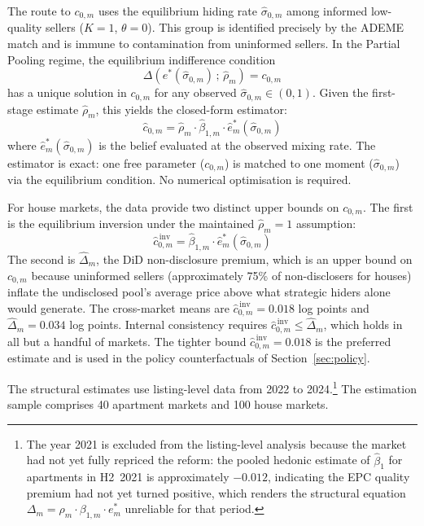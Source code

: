 \documentclass[10pt,letterpaper]{bp-template-concise}
\begin{document}
The route to $c_{0,m}$ uses the equilibrium hiding rate $\hat\sigma_{0,m}$ among informed low-quality sellers ($K=1$, $\theta=0$). This group is identified precisely by the ADEME match and is immune to contamination from uninformed sellers. In the Partial Pooling regime, the equilibrium indifference condition
\begin{equation}
    \Delta\!\left(e^*(\hat\sigma_{0,m})\,;\,\hat\rho_m\right) = c_{0,m}
    \label{eq:indifference}
\end{equation}
has a unique solution in $c_{0,m}$ for any observed $\hat\sigma_{0,m}\in(0,1)$. Given the first-stage estimate $\hat\rho_m$, this yields the closed-form estimator:
\begin{equation}
    \hat{c}_{0,m} = \hat\rho_m \cdot \hat\beta_{1,m} \cdot \hat{e}^*_m(\hat\sigma_{0,m})
    \label{eq:c0_estimator}
\end{equation}
where $\hat{e}^*_m(\hat\sigma_{0,m})$ is the belief evaluated at the observed mixing rate. The estimator is exact: one free parameter ($c_{0,m}$) is matched to one moment ($\hat\sigma_{0,m}$) via the equilibrium condition. No numerical optimisation is required.

For house markets, the data provide two distinct upper bounds on $c_{0,m}$. The first is the equilibrium inversion under the maintained $\hat\rho_m = 1$ assumption:
\begin{equation}
    \hat{c}_{0,m}^{\,\text{inv}} = \hat\beta_{1,m} \cdot \hat{e}^*_m(\hat\sigma_{0,m})
    \label{eq:c0_interval}
\end{equation}
The second is $\hat\Delta_m$, the DiD non-disclosure premium, which is an upper bound on $c_{0,m}$ because uninformed sellers (approximately 75\% of non-disclosers for houses) inflate the undisclosed pool's average price above what strategic hiders alone would generate. The cross-market means are $\hat{c}_{0,m}^{\,\text{inv}} = 0.018$ log points and $\hat\Delta_m = 0.034$ log points. Internal consistency requires $\hat{c}_{0,m}^{\,\text{inv}} \leq \hat\Delta_m$, which holds in all but a handful of markets. The tighter bound $\hat{c}_{0,m}^{\,\text{inv}} = 0.018$ is the preferred estimate and is used in the policy counterfactuals of Section~\ref{sec:policy}.

The structural estimates use listing-level data from 2022 to 2024.\footnote{The year 2021 is excluded from the listing-level analysis because the market had not yet fully repriced the reform: the pooled hedonic estimate of $\hat\beta_{1}$ for apartments in H2~2021 is approximately $-0.012$, indicating the EPC quality premium had not yet turned positive, which renders the structural equation $\Delta_m = \rho_m\cdot\beta_{1,m}\cdot e^*_m$ unreliable for that period.} The estimation sample comprises 40 apartment markets and 100 house markets.
\end{document}
